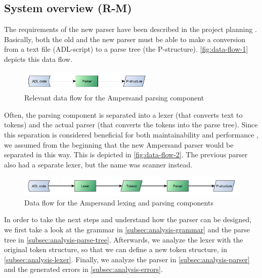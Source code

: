 
\subsection{System overview (R-M)}
The requirements of the new parser have been described in the project planning .
Basically, both the old and the new parser must be able to make a conversion from a text file (ADL-script) to a parse tree (the P-structure).
\autoref{fig:data-flow-1} depicts this data flow.
%
\begin{figure}[htb!]
	\centering
	\includegraphics[width=0.586\textwidth]{Figures/DataFlow1}
	\caption{Relevant data flow for the Ampersand parsing component}
	\label{fig:data-flow-1}
\end{figure}

Often, the parsing component is separated into a lexer (that converts text to tokens) and the actual parser (that converts the tokens into the parse tree).
Since this separation is considered beneficial for both maintainability and performance , we assumed from the beginning that the new Ampersand parser would be separated in this way.
This is depicted in \autoref{fig:data-flow-2}.
The previous parser also had a separate lexer, but the name was scanner instead.
%
\begin{figure}[htb!]
	\centering
	\includegraphics[width=1\textwidth]{Figures/DataFlow2}
	\caption{Data flow for the Ampersand lexing and parsing components}
	\label{fig:data-flow-2}
\end{figure}

In order to take the next steps and understand how the parser can be designed, we first take a look at the grammar in \autoref{subsec:analysis-grammar} and the parse tree in \autoref{subsec:analysis-parse-tree}.
Afterwards, we analyze the lexer with the original token structure, so that we can define a new token structure, in \autoref{subsec:analysis-lexer}.
Finally, we analyze the parser in \autoref{subsec:analysis-parser} and the generated errors in \autoref{subsec:analysis-errors}.
